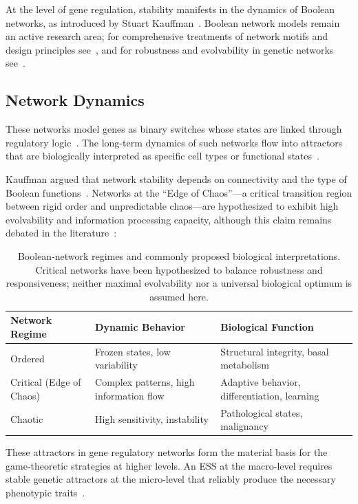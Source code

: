 \documentclass[12pt,a4paper]{article}
\theoremstyle{remark}
\begin{document}
At the level of gene regulation, stability manifests in the dynamics of Boolean networks, as introduced by Stuart Kauffman~\citep{BooleanPost,KauffmanOrigins}. Boolean network models remain an active research area; for comprehensive treatments of network motifs and design principles see~\citet{AlonSystems2007}, and for robustness and evolvability in genetic networks see~\citet{WagnerRobustness2005}.

\subsection{Network Dynamics}

These networks model genes as binary switches whose states are linked through regulatory logic~\citep{BooleanPost}. The long-term dynamics of such networks flow into attractors that are biologically interpreted as specific cell types or functional states~\citep{BooleanEvolution}.

Kauffman argued that network stability depends on connectivity and the type of Boolean functions~\citep{BooleanPost}. Networks at the ``Edge of Chaos''---a critical transition region between rigid order and unpredictable chaos---are hypothesized to exhibit high evolvability and information processing capacity, although this claim remains debated in the literature~\citep{KauffmanOrigins}:

\begin{table}[htbp]
\centering
\caption{Boolean-network regimes and commonly proposed biological interpretations. Critical networks have been hypothesized to balance robustness and responsiveness; neither maximal evolvability nor a universal biological optimum is assumed here.}
\label{tab:network-regimes}
\begin{tabularx}{\textwidth}{@{}L{0.22\textwidth} L{0.28\textwidth} Y@{}}
\toprule
\textbf{Network Regime} & \textbf{Dynamic Behavior} & \textbf{Biological Function} \\
\midrule
Ordered & Frozen states, low variability & Structural integrity, basal metabolism \\
Critical (Edge of Chaos) & Complex patterns, high information flow & Adaptive behavior, differentiation, learning \\
Chaotic & High sensitivity, instability & Pathological states, malignancy \\
\bottomrule
\end{tabularx}
\end{table}

These attractors in gene regulatory networks form the material basis for the game-theoretic strategies at higher levels. An ESS at the macro-level requires stable genetic attractors at the micro-level that reliably produce the necessary phenotypic traits~\citep{BooleanMicroarray,KauffmanOrigins}.
\end{document}
